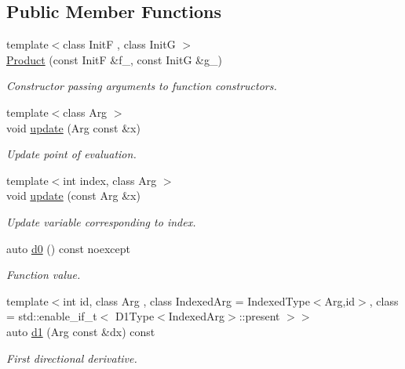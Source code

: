 \subsection*{Public Member Functions}
\begin{DoxyCompactItemize}
\item 
{\footnotesize template$<$class Init\+F , class Init\+G $>$ }\\\hyperlink{structFunG_1_1MathematicalOperations_1_1Product_a98d62512443b8c9d31466998b0fa6ee8}{Product} (const Init\+F \&f\+\_\+, const Init\+G \&g\+\_\+)
\begin{DoxyCompactList}\small\item\em Constructor passing arguments to function constructors. \end{DoxyCompactList}\item 
{\footnotesize template$<$class Arg $>$ }\\void \hyperlink{structFunG_1_1MathematicalOperations_1_1Product_a5b45c1bac06651ee5b6ea79fb5128ef9}{update} (Arg const \&x)
\begin{DoxyCompactList}\small\item\em Update point of evaluation. \end{DoxyCompactList}\item 
{\footnotesize template$<$int index, class Arg $>$ }\\void \hyperlink{structFunG_1_1MathematicalOperations_1_1Product_a8db3d935bbe273c0436ff3bc6bb6b786}{update} (const Arg \&x)
\begin{DoxyCompactList}\small\item\em Update variable corresponding to index. \end{DoxyCompactList}\item 
auto \hyperlink{structFunG_1_1MathematicalOperations_1_1Product_ad0c816f33a344bc7ca816dbaad9c78f8}{d0} () const noexcept
\begin{DoxyCompactList}\small\item\em Function value. \end{DoxyCompactList}\item 
{\footnotesize template$<$int id, class Arg , class Indexed\+Arg  = Indexed\+Type$<$\+Arg,id$>$, class  = std\+::enable\+\_\+if\+\_\+t$<$ D1\+Type$<$\+Indexed\+Arg$>$\+::present $>$$>$ }\\auto \hyperlink{structFunG_1_1MathematicalOperations_1_1Product_aea69feaac16f79717a85d7b089a80f8f}{d1} (Arg const \&dx) const 
\begin{DoxyCompactList}\small\item\em First directional derivative. \end{DoxyCompactList}\item 

\end{DoxyCompactItemize}
